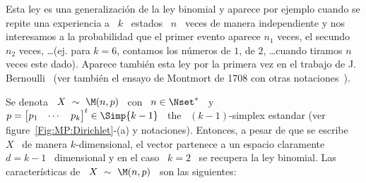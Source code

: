\label{Sssec:MP:Multinomial}

Esta ley es una generalizaci\'on de la ley binomial y aparece por ejemplo cuando
se  repite  una  experiencia  a  \  $k$  \ estados  \  $n$  \  veces  de  manera
independiente y nos  interesamos a la probabilidad que  el primer evento aparece
$n_1$ veces,  el secundo  $n_2$ veces, \ldots  (ej. para  $k = 6$,  contamos los
n\'umeros de  $1$, de $2$, \ldots  cuando tiramos $n$ veces  este dado). Aparece
tambi\'en    esta   ley    por   la    primera    vez   en    el   trabajo    de
J.  Bernoulli~\cite{Ber1713,  Hal90,  DavEdw01}  (ver  tambi\'en  el  ensayo  de
Montmort de 1708 con otras notaciones~\cite{Mon13}).

Se  denota  \  $X  \ \sim  \  \M(n,p)$  \  con  \  $n  \in  \Nset^*$ \  y  \  $p
= \begin{bmatrix}  p_1 & \cdots  & p_k \end{bmatrix}^t  \in \Simp{k-1}$ \  the \
$(k-1)$-simplex  estandar (ver figure~\ref{Fig:MP:Dirichlet}-(a)  y notaciones).
Entonces, a pesar de que se escribe \ $X$ \ de manera $k$-dimensional, el vector
partenece a un espacio claramente \ $d =  k-1$ \ dimensional y en el caso \ $k =
2$  \ se  recupera la  ley binomial.   Las caracter\'isticas  de \  $X \  \sim \
\M(n,p)$ \ son las siguientes:

